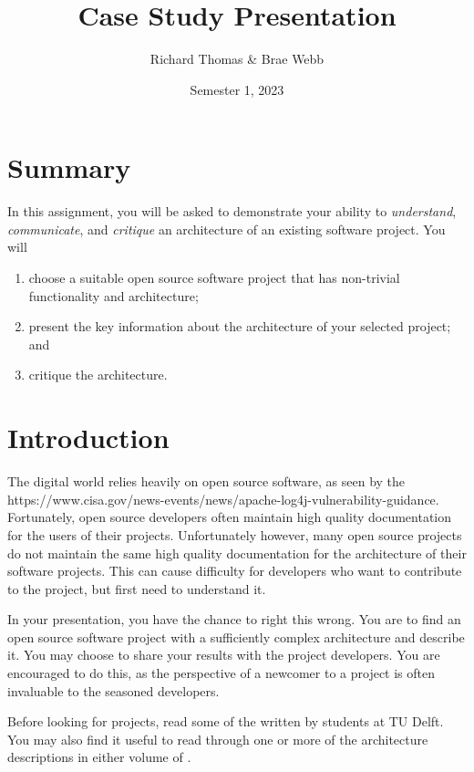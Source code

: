 \documentclass{csse4400}
\title{Case Study Presentation}
\author{Richard Thomas \& Brae Webb}
\date{Semester 1, 2023}
\begin{document}
\maketitle

\section*{Summary}
In this assignment, you will be asked to demonstrate your ability to
\textsl{understand}, \textsl{communicate}, and \textsl{critique} an architecture of an existing software project.
You will
\begin{enumerate}
    \item choose a suitable open source software project that has non-trivial functionality and architecture;
    \item present the key information about the architecture of your selected project; and
    \item critique the architecture.
\end{enumerate}


\section{Introduction}
The digital world relies heavily on open source software, as seen by the 
{https://www.cisa.gov/news-events/news/apache-log4j-vulnerability-guidance}.
Fortunately, open source developers often maintain high quality documentation for the users of their projects.
Unfortunately however, many open source projects do not maintain the same high quality documentation
for the architecture of their software projects. This can cause difficulty for developers who want to
contribute to the project, but first need to understand it.

In your presentation, you have the chance to right this wrong.
You are to find an open source software project with a sufficiently complex architecture and describe it.
You may choose to share your results with the project developers.
You are encouraged to do this, as the perspective of a newcomer to a project is often invaluable to the seasoned developers.

Before looking for projects, read some of the 
 written by students at TU Delft.
You may also find it useful to read through one or more of the architecture descriptions in either volume of
.
\end{document}
